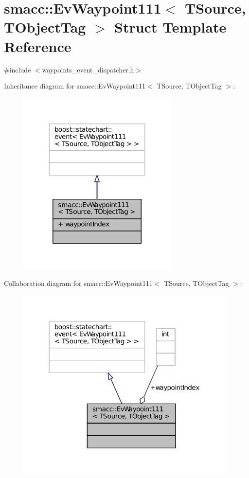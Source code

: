 \hypertarget{structsmacc_1_1EvWaypoint111}{}\section{smacc\+:\+:Ev\+Waypoint111$<$ T\+Source, T\+Object\+Tag $>$ Struct Template Reference}
\label{structsmacc_1_1EvWaypoint111}


{\ttfamily \#include $<$waypoints\+\_\+event\+\_\+dispatcher.\+h$>$}



Inheritance diagram for smacc\+:\+:Ev\+Waypoint111$<$ T\+Source, T\+Object\+Tag $>$\+:
\nopagebreak
\begin{figure}[H]
\begin{center}
\leavevmode
\includegraphics[width=227pt]{structsmacc_1_1EvWaypoint111__inherit__graph}
\end{center}
\end{figure}


Collaboration diagram for smacc\+:\+:Ev\+Waypoint111$<$ T\+Source, T\+Object\+Tag $>$\+:
\nopagebreak
\begin{figure}[H]
\begin{center}
\leavevmode
\includegraphics[width=312pt]{structsmacc_1_1EvWaypoint111__coll__graph}
\end{center}
\end{figure}
